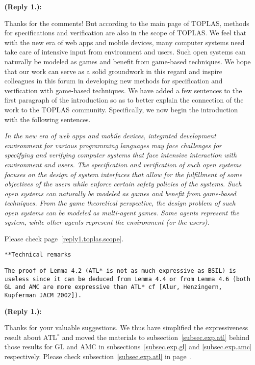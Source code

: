 \documentclass[11pt]{article}
\newcounter{cabbage1}
\newcounter{cabbage2}
\newcounter{cabbage3}
\newcounter{bean1}
\newcounter{bean2}
\newcounter{bean3}
\newcounter{bean4}
\newcounter{bean5}
\newcounter{bean6}
\newenvironment{reply1}{\begin{list}{\bf (Reply 1.\arabic{bean1}):} 
        {\usecounter{bean1}\setcounter{bean1}{\value{cabbage1}} \item \setcounter{cabbage1}{\value{bean1}} 
        }
}{\end{list}}
\begin{document}
\begin{reply1} 
Thanks for the comments!  
But according to the main page of TOPLAS, methods for specifications and verification are also in the scope of TOPLAS.  
We feel that with the new era of web apps and mobile devices, 
many computer systems need take care of intensive input from environment and users.  
Such open systems can naturally be modeled as games and 
benefit from game-based techniques.  
We hope that our work can serve as a solid groundwork 
in this regard and inspire colleagues in this forum in 
developing new methods for specification and verification with game-based 
techniques.  
We have added a few sentences to the first paragraph of the introduction 
so as to better explain the connection of the work to the TOPLAS community. 
Specifically, we now begin the introduction with the following sentences. 
\begin{center} 
\parbox{120mm}{\em  
In the new era of web apps and mobile devices, integrated development 
environment for various programming languages may face challenges for 
specifying and verifying  
computer systems that face intensive interaction with environment and users.  
The specification and verification of such open systems
focuses on the design of system interfaces that allow 
for the fulfillment of some objectives of the users while 
enforce certain safety policies of the systems.
Such open systems can naturally be modeled as games and 
benefit from game-based techniques.  
From the game theoretical perspective, the design problem 
of such open systems can be modeled as multi-agent games.  
Some agents represent the system, while 
other agents represent the environment (or the users).  
} 
\end{center} 
Please check page~\ref{reply1.toplas.scope}.  
\end{reply1} 
\begin{verbatim} 
**Technical remarks 

The proof of Lemma 4.2 (ATL* is not as much expressive as BSIL) is 
useless since it can be deduced from Lemma 4.4 or from Lemma 4.6 (both 
GL and AMC are more expressive than ATL* cf [Alur, Henzingern, 
Kupferman JACM 2002]). 
\end{verbatim} 
\begin{reply1} 
Thanks for your valuable suggestions. 
We thus have simplified the expressiveness result about ATL$^*$ and 
moved the materials to subsection~\ref{subsec.exp.atl} behind those results for 
GL and AMC in subsections~\ref{subsec.exp.gl} and \ref{subsec.exp.amc} respectively.  
Please check subsection~\ref{subsec.exp.atl} in page~\pageref{subsec.exp.atl}. 
\end{reply1} 
\end{document}
